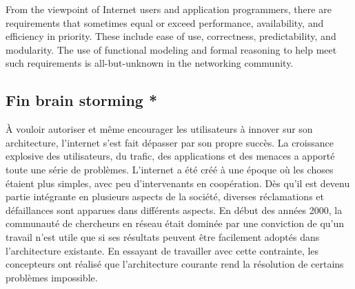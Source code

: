 From the viewpoint of Internet users and application programmers, there are requirements that sometimes equal or exceed performance, availability, and efficiency in priority. These include ease of use, correctness, predictability, and modularity. The use of functional modeling and formal reasoning to help meet such requirements is all-but-unknown in the networking community.


\subsection*{Fin brain storming *}





À vouloir autoriser et même encourager les utilisateurs à innover sur son architecture, l'internet s'est fait dépasser par son propre succès. La croissance explosive des utilisateurs, du trafic, des applications et des menaces a apporté toute une série de problèmes. L'internet a été créé à une époque où les choses étaient plus simples, avec peu d'intervenants en coopération. Dès qu'il est devenu partie intégrante en plusieurs aspects de la société, diverses réclamations et défaillances sont apparues dans différents aspects. En début des années 2000, la communauté de chercheurs en réseau était dominée par une conviction de qu'un travail n'est utile que si ses résultats peuvent être facilement adoptés dans l'architecture existante. En essayant de travailler avec cette contrainte, les concepteurs ont réalisé que l'architecture courante rend la résolution de certains problèmes impossible. \cite{InternetEvolutionRoleSoftwareEngineeringRealInternet}






